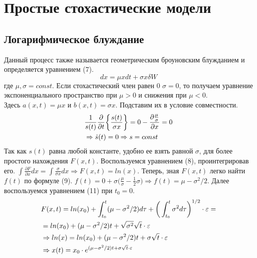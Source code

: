 \documentclass[12pt]{article}
\theoremstyle{definition}
\begin{document}
 \section{Простые стохастические модели}
 \subsection{Логарифмическое блуждание}
Данный процесс также называется геометрическим броуновским блужданием и определяется уравнением (7).
\begin{equation}
dx=\mu x dt +\sigma x \delta W
\end{equation}
где $\mu, \sigma=const$. Если стохастический член равен 0 $\sigma=0$, то получаем уравнение экспоненциального пространство
при $\mu>0$ и снижения при $\mu<0$.\\
Здесь $a(x,t)=\mu x$ и $b(x,t)=\sigma x$. Подставим их в условие совместности.
\begin{align}
  &\frac{1}{s(t)}\frac{\partial}{\partial t}\bigg\{ \frac{s(t)}{\sigma x} \bigg\}=\notag
  0-\frac{\partial \frac{\mu}{\sigma}}{\partial x}=0\\
  &\Rightarrow \dot{s}(t)=0 \Rightarrow s=const\notag
\end{align}
Так как $s(t)$ равна любой константе, удобно ее взять равной $\sigma$, для более простого нахождения $F(x,t)$.
Воспользуемся уравнением (8), проинтегрировав его. $\displaystyle \int \frac{\partial F}{\partial x}dx=
\int\frac{\sigma}{\sigma x}dx\Rightarrow F(x,t)=ln(x)$. Теперь, зная $F(x,t)$ легко найти $f(t)$ по формуле (9).
$\displaystyle f(t)=0+\sigma\bigg(\frac{\mu}{\sigma}-\frac{1}{2}\sigma\bigg)\Rightarrow f(t)=\mu-\sigma^2/2$.
Далее воспользуемся уравнением (11) при $t_0=0$.
\begin{align}
  &F(x,t)=ln(x_0)+\int_{t_0}^t (\mu-\sigma^2/2)d\tau+\bigg(\int_{t_0}^t \sigma^2d\tau\bigg)^{1/2}\cdot\varepsilon=\notag\\
  &=ln(x_0)+(\mu-\sigma^2/2)t+\sqrt{\sigma^2}\sqrt{t}\cdot\varepsilon\notag\\
  &\Rightarrow ln(x)=ln(x_0)+(\mu-\sigma^2/2)t+\sigma\sqrt{t}\cdot\varepsilon\notag\\
  &\Rightarrow x(t)=x_0\cdot e^{(\mu-\sigma^2/2)t+\sigma\sqrt{t}\cdot\varepsilon}\notag
\end{align}
\end{document}
